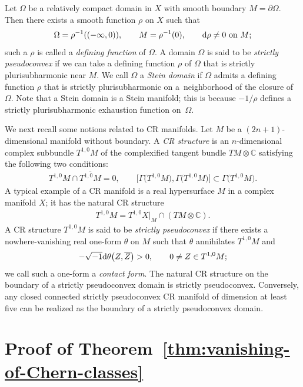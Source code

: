 \documentclass[pdftex]{sigma}
\numberwithin{equation}{section}
\begin{document}
Let $\Omega$ be a relatively compact domain in $X$ with smooth boundary $M = \partial \Omega$. Then there exists a smooth function $\rho$ on $X$ such that
\begin{gather*}
\Omega = \rho^{-1}((- \infty, 0)), \qquad M = \rho^{- 1}(0), \qquad
{\rm d} \rho \neq 0 \ \text{on} \ M;
\end{gather*}
such a $\rho$ is called a \emph{defining function} of $\Omega$. A domain $\Omega$ is said to be \emph{strictly pseudoconvex} if we can take a defining function $\rho$ of $\Omega$ that is strictly plurisubharmonic near $M$. We call $\Omega$ a \emph{Stein domain} if $\Omega$ admits a defining function $\rho$ that is strictly plurisubharmonic on a~neighborhood of the closure of $\Omega$. Note that a Stein domain is a Stein manifold; this is because $- 1 / \rho$ defines a strictly plurisubharmonic exhaustion function on~$\Omega$.

We next recall some notions related to CR manifolds. Let $M$ be a $(2 n + 1)$-dimensional manifold without boundary. A \emph{CR structure} is an $n$-dimensional complex subbundle $T^{1, 0} M$ of the complexified tangent bundle $T M \otimes \mathbb{C}$ satisfying the following two conditions:
\begin{gather*}
T^{1, 0} M \cap \overline{T^{1, 0} M} = 0, \qquad
\big[\Gamma\big(T^{1,0}M\big), \Gamma\big(T^{1,0}M\big)\big] \subset \Gamma\big(T^{1,0}M\big).
\end{gather*}
A typical example of a CR manifold is a real hypersurface $M$ in a complex manifold $X$; it has the natural CR structure
\begin{gather*}
T^{1, 0} M= T^{1, 0} X |_{M} \cap (T M \otimes \mathbb{C}).
\end{gather*}
A CR structure $T^{1, 0} M$ is said to be \emph{strictly pseudoconvex} if there exists a nowhere-vanishing real one-form $\theta$ on $M$ such that $\theta$ annihilates $T^{1, 0} M$ and
\begin{gather*}
- \sqrt{- 1} {\rm d} \theta \big(Z, \overline{Z}\big) > 0, \qquad 0 \neq Z \in T^{1, 0} M;
\end{gather*}
we call such a one-form a \emph{contact form}. The natural CR structure on the boundary of a strictly pseudoconvex domain is strictly pseudoconvex. Conversely, any closed connected strictly pseudoconvex CR manifold of dimension at least five can be realized as the boundary of a strictly pseudoconvex domain.

\section{Proof of Theorem~\ref{thm:vanishing-of-Chern-classes}} \label{section:proof-of-theorem}
\end{document}
